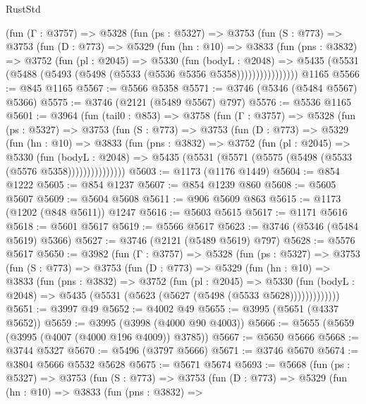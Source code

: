 \begin{lexlean}{RustStd}
\begin{coremodule}
        (fun (Γ : @3757) =>
        @5328
          (fun (ps : @5327) =>
          @3753
            (fun (S : @773) =>
            @3753
              (fun (D : @773) =>
              @5329
                (fun (hn : @10) =>
                @3833
                  (fun (pns : @3832) =>
                  @3752
                    (fun (pl : @2045) =>
                    @5330
                      (fun (bodyL : @2048) =>
                      @5435 (@5531 (@5488 (@5493 (@5498 (@5533 (@5536 @5356 @5358))))))))))))))))
    @1165
@5566 := @845 @1165
@5567 := @5566 @5358
@5571 := @3746 (@5346 (@5484 @5567) @5366)
@5575 := @3746 (@2121 (@5489 @5567) @797)
@5576 := @5536 @1165
@5601 := @3964
    (fun (tail0 : @853) =>
    @3758
      (fun (Γ : @3757) =>
      @5328
        (fun (ps : @5327) =>
        @3753
          (fun (S : @773) =>
          @3753
            (fun (D : @773) =>
            @5329
              (fun (hn : @10) =>
              @3833
                (fun (pns : @3832) =>
                @3752
                  (fun (pl : @2045) =>
                  @5330
                    (fun (bodyL : @2048) =>
                    @5435 (@5531 (@5571 (@5575 (@5498 (@5533 (@5576 @5358)))))))))))))))
@5603 := @1173 (@1176 @1449)
@5604 := @854 @1222
@5605 := @854 @1237
@5607 := @854 @1239 @860
@5608 := @5605 @5607
@5609 := @5604 @5608
@5611 := @906 @5609 @863
@5615 := @1173 (@1202 (@848 @5611)) @1247
@5616 := @5603 @5615
@5617 := @1171 @5616
@5618 := @5601 @5617
@5619 := @5566 @5617
@5623 := @3746 (@5346 (@5484 @5619) @5366)
@5627 := @3746 (@2121 (@5489 @5619) @797)
@5628 := @5576 @5617
@5650 := @3982
    (fun (Γ : @3757) =>
    @5328
      (fun (ps : @5327) =>
      @3753
        (fun (S : @773) =>
        @3753
          (fun (D : @773) =>
          @5329
            (fun (hn : @10) =>
            @3833
              (fun (pns : @3832) =>
              @3752
                (fun (pl : @2045) =>
                @5330
                  (fun (bodyL : @2048) =>
                  @5435 (@5531 (@5623 (@5627 (@5498 (@5533 @5628)))))))))))))
@5651 := @3997 @49
@5652 := @4002 @49
@5655 := @3995 (@5651 (@4337 @5652))
@5659 := @3995 (@3998 (@4000 @90 @4003))
@5666 := @5655 (@5659 (@3995 (@4007 (@4000 @196 @4009)) @3785))
@5667 := @5650 @5666
@5668 := @3744 @5327
@5670 := @5496 (@3797 @5666)
@5671 := @3746 @5670
@5674 := @3804 @5666 @5532 @5628
@5675 := @5671 @5674
@5693 := @5668
    (fun (ps : @5327) =>
    @3753
      (fun (S : @773) =>
      @3753
        (fun (D : @773) =>
        @5329
          (fun (hn : @10) =>
          @3833
            (fun (pns : @3832) =>

\end{coremodule}
\end{lexlean}
